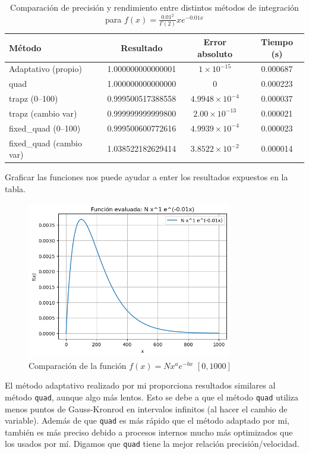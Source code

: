 \documentclass{article}
\begin{document}
\begin{table}[h!]
    \centering
    \begin{tabular}{|l|c|c|c|}
    \hline
    \textbf{Método} & \textbf{Resultado} & \textbf{Error absoluto} & \textbf{Tiempo (s)} \\
    \hline
    Adaptativo (propio) & 1.000000000000001 & $1 \times 10^{-15}$ & 0.000687 \\
    quad                & 1.000000000000000 & $0$                 & 0.000223 \\
    trapz (0--100)       & 0.999500517388558 & $4.9948 \times 10^{-4}$ & 0.000037 \\
    trapz (cambio var)   & 0.999999999999800 & $2.00 \times 10^{-13}$  & 0.000021 \\
    fixed\_quad (0--100) & 0.999500600772616 & $4.9939 \times 10^{-4}$ & 0.000023 \\
    fixed\_quad (cambio var) & 1.038522182629414 & $3.8522 \times 10^{-2}$ & 0.000014 \\
    \hline
    \end{tabular}
    \caption{Comparación de precisión y rendimiento entre distintos métodos de integración para $f(x) = \frac{0.01^{2}}{\Gamma(2)} x e^{-0.01x}$}
    \label{tab:resultados_exponencial}
\end{table}
Graficar las funciones nos puede ayudar a enter los resultados expuestos en la tabla. 
\begin{figure}
    \centering
    \includegraphics[width=0.8\textwidth]{figures/f_prueba_exp.png}
    \caption{Comparación de la función $f(x) = N x^a e^{-bx}$ $[0, 1000]$}
    \label{fig:gauss_kronrod}
\end{figure}

El método adaptativo realizado por mi proporciona resultados similares al método \texttt{quad}, aunque algo más lentos. Esto se debe a que el método \texttt{quad} utiliza menos puntos de Gauss-Kronrod en intervalos infinitos (al hacer el cambio de variable). Además de que \texttt{quad} es más rápido que el método adaptado por mi, también es más preciso debido a procesos internos mucho más optimizados que los usados por mí. Digamos que \texttt{quad} tiene la mejor relación precisión/velocidad.
\end{document}
